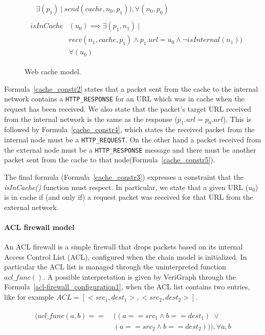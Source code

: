 \begin{figure}[h]
{\begin{subequations}
\begin{align}
\begin{split}
			& \exists  (p_{1}) \: | \: send( cache,n_{0}, p_{1})), \forall (n_{0}, p_{0})			
			\end{split} \\
			\begin{split}
			\label{cache_constr3}
			isInCache&(u_{0}) \implies \exists (p_{1}, n_{1}) \: | \:  \\
			& recv(n_{1}, cache, p_{1})  \wedge p_{1}.url = u_{0} \wedge \neg isInternal(n_{1})) \\
			& \forall (u_{0})
			\end{split}
			\end{align}
			\end{subequations}
			}%
			\caption{Web cache model.}
			\label{cache_model}
\end{figure}

Formula~\ref{cache_constr2} states that a packet sent from the cache to the internal network contains a \texttt{HTTP\_RESPONSE} for an URL which was in cache when the request has been received. We also state that the packet's  target URL  received from the internal network is the same as the response (\textit{$p_{1}.url = p_{0}.url$}). This is followed by Formula~\ref{cache_constr4}, which states the received packet from the internal node must be a  \texttt{HTTP\_REQUEST}. On the other hand a packet received from the external node must be a  \texttt{HTTP\_RESPONSE} message and there must be another packet sent from the cache to that node(Formula~\ref{cache_constr5}).

The final formula (Formula~\ref{cache_constr3}) expresses a constraint that the \textit{isInCache()} function must respect. In particular, we state that a given URL ($u_{0}$) is in cache if (and only if) a request packet was received for that URL from the external network.

\paragraph{ACL firewall model} An ACL firewall is a simple firewall that drops packets based on its internal Access Control List (ACL), configured when the chain model is initialized. In particular the ACL list is managed through the uninterpreted function \textit{$acl\_func()$}. A possible interpretation is given by VeriGraph through the Formula~\ref{acl-firewall_configuration1}, when the ACL list contains two entries, like for example \textit{$ACL = [<src_1, dest_1>,<src_2,dest_2>]$}.
	\begin{figure}[h]
		{\footnotesize
			\begin{subequations}
				\begin{align}
					\begin{split}
						\label{acl-firewall_configuration1}
						(acl\_func(a, b) == \;& ((a == src_1 \wedge b == dest_1 ) \; \vee \\
						& (a == src_2 \wedge b == dest_2))), \forall a, b
					\end{split}
				\end{align}
			\end{subequations}
		}%
	\end{figure}


